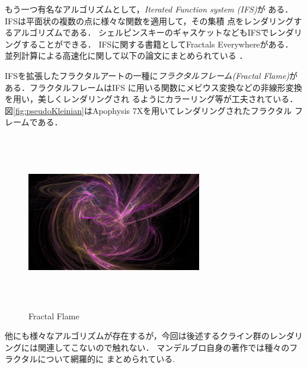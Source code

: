 もう一つ有名なアルゴリズムとして，{\it Iterated Function system (IFS)}が
ある．
IFSは平面状の複数の点に様々な関数を適用して，その集積
点をレンダリングするアルゴリズムである．
シェルピンスキーのギャスケットなどもIFSでレンダリングすることができる．
IFSに関する書籍としてFractals Everywhere\cite{fractalsEverywhere}がある．
並列計算による高速化に関して以下の論文にまとめられている
\cite{highPerformanceIFS}\cite{GPUIFS}．

IFSを拡張したフラクタルアートの一種に\emph{フラクタルフレーム}{\it(Fractal
Flame)}\cite{fractalFlame}がある．フラクタルフレームはIFS
に用いる関数にメビウス変換などの非線形変換を用い，美しくレンダリングされ
るようにカラーリング等が工夫されている．
図\ref{fig:pseudoKleinian}はApophysis 7Xを用いてレンダリングされたフラクタル
フレームである．

\begin{figure}[htbp]
  \begin{center}
   \includegraphics[width=3in, height=3in, keepaspectratio]{../img/fractal/fractalFlame.pdf}
   \caption{Fractal Flame}
   \label{fig:fractalFlame}
  \end{center}
\end{figure}

他にも様々なアルゴリズムが存在するが，今回は後述するクライン群のレンダリ
ングには関連してこないので触れない．
マンデルブロ自身の著作\cite{fractal}では種々のフラクタルについて網羅的に
まとめられている.

\clearpage